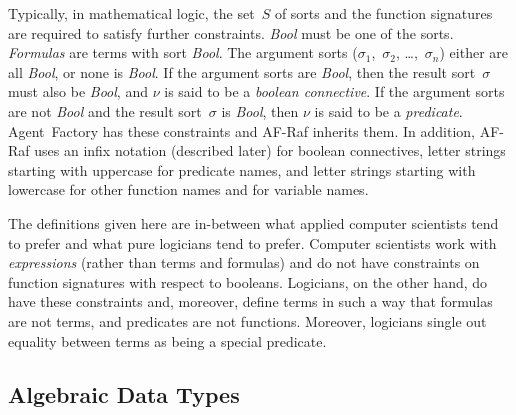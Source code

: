\documentclass[a4paper,12pt,oneside,fleqn]{book} %
\newcommand{\rg}[1]{\marginpar{\tiny\raggedright\textcolor{blue}{\bf rg:} #1}}
\renewcommand{\rg}{}
\begin{document}
Typically, in mathematical logic, the set~$S$ of sorts and the function
signatures are required to satisfy further constraints. \textit{Bool} must
be one of the sorts. \emph{Formulas} are terms with sort \textit{Bool}.
The argument sorts ($\sigma_1$,~$\sigma_2$, \dots,~$\sigma_n$) either are
all \textit{Bool}, or none is \textit{Bool}.  If the argument sorts are
\textit{Bool}, then the result sort~$\sigma$ must also be \textit{Bool},
and $\nu$ is said to be a \emph{boolean connective}.  If the argument sorts
are not \textit{Bool} and the result sort~$\sigma$ is \textit{Bool}, then
$\nu$ is said to be a \emph{predicate}.  Agent~Factory has these
constraints and AF-Raf inherits them. In addition, AF-Raf uses an infix
notation (described later) for boolean connectives, letter strings starting
with uppercase for predicate names, and letter strings starting with
lowercase for other function names and for variable names.

\begin{remark}
The definitions given here are in-between what applied computer scientists
tend to prefer and what pure logicians tend to prefer.  Computer scientists
work with \emph{expressions} (rather than terms and formulas) and do not
have constraints on function signatures with respect to booleans.
Logicians, on the other hand, do have these constraints and, moreover,
define terms in such a way that formulas are not terms, and predicates are
not functions. Moreover, logicians single out equality between terms as
being a special predicate.
\end{remark}

\subsection{Algebraic Data Types} %
\end{document}
